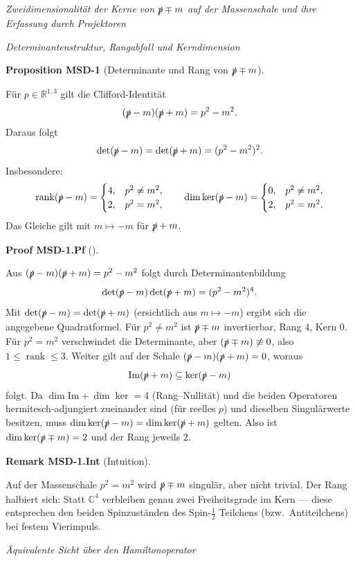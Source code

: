 \documentclass[10pt, letterpaper]{article}
\newcommand{\R}{\mathbb{R}}
\newcommand{\C}{\mathbb{C}}
\newcommand{\CustomHeading}[3]{%
  \par\medskip\noindent%
  \textbf{#1 #2} \textnormal{(#3)}.\enskip%
}
\newenvironment{PROP}[2]{\begin{unitbox}\CustomHeading{Proposition}{#1}{#2}}{\end{unitbox}}
\newenvironment{REM}[2]{\begin{unitbox}\CustomHeading{Remark}{#1}{#2}}{\end{unitbox}}
\newenvironment{PROOF}[2]{\begin{unitbox}\CustomHeading{Proof}{#1}{#2}}{\end{unitbox}}
\begin{document}
\emph{Zweidimensionalität der Kerne von $\slashed p\mp m$ auf der Massenschale
und ihre Erfassung durch Projektoren}

\emph{Determinantenstruktur, Rangabfall und Kerndimension}

\begin{PROP}{MSD-1}{Determinante und Rang von $\slashed p\mp m$}
Für $p\in\R^{1,3}$ gilt die Clifford-Identität
\[
(\slashed p-m)(\slashed p+m)=p^2-m^2.
\]
Daraus folgt
\[
\det(\slashed p-m)=\det(\slashed p+m)=(p^2-m^2)^2.
\]
Insbesondere:
\[
\operatorname{rank}(\slashed p-m)=
\begin{cases}
4,& p^2\ne m^2,\\
2,& p^2=m^2,
\end{cases}
\qquad
\dim\ker(\slashed p-m)=
\begin{cases}
0,& p^2\ne m^2,\\
2,& p^2=m^2.
\end{cases}
\]
Das Gleiche gilt mit $m\mapsto -m$ für $\slashed p+m$.
\end{PROP}

\begin{PROOF}{MSD-1.Pf}{}
Aus $(\slashed p-m)(\slashed p+m)=p^2-m^2$ folgt durch Determinantenbildung
\[
\det(\slashed p-m)\det(\slashed p+m)=(p^2-m^2)^4.
\]
Mit $\det(\slashed p-m)=\det(\slashed p+m)$ (ersichtlich aus $m\mapsto -m$) ergibt sich die angegebene Quadratformel.
Für $p^2\ne m^2$ ist $\slashed p\mp m$ invertierbar, Rang $4$, Kern $0$.
Für $p^2=m^2$ verschwindet die Determinante, aber $(\slashed p\mp m)\not\equiv 0$, also $1\le\operatorname{rank}\le 3$.
Weiter gilt auf der Schale $(\slashed p-m)(\slashed p+m)=0$, woraus
\[
\mathrm{Im}(\slashed p+m)\subseteq \ker(\slashed p-m)
\]
folgt. Da $\dim\mathrm{Im}+\dim\ker=4$ (Rang–Nullität) und die beiden Operatoren hermitesch-adjungiert zueinander sind (für reelles $p$) und dieselben Singulärwerte besitzen, muss $\dim\ker(\slashed p-m)=\dim\ker(\slashed p+m)$ gelten. Also ist $\dim\ker(\slashed p\mp m)=2$ und der Rang jeweils $2$.
\end{PROOF}

\begin{REM}{MSD-1.Int}{Intuition}
Auf der Massenschale $p^2=m^2$ wird $\slashed p\mp m$ singulär, aber nicht trivial. Der Rang halbiert sich: Statt $\C^4$ verbleiben genau zwei Freiheitsgrade im Kern — diese entsprechen den beiden Spinzuständen des Spin-$\tfrac12$ Teilchens (bzw.\ Antiteilchens) bei festem Vierimpuls.
\end{REM}

\emph{Äquivalente Sicht über den Hamiltonoperator}
\end{document}
